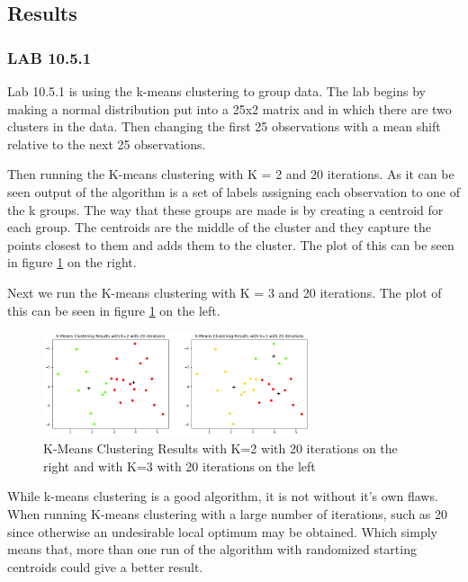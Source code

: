 \subsection{Results} %
\subsubsection*{LAB 10.5.1}
Lab 10.5.1 is using the k-means clustering to group data. The lab begins by making a normal distribution put into a 25x2 matrix and in which there are two clusters in the data. Then changing the first 25 observations with a mean shift relative to the next 25 observations.

Then running the K-means clustering with K = 2 and 20 iterations. As it can be seen output of the algorithm is a set of labels assigning each observation to one of the k groups. The way that these groups are made is by creating a centroid for each group. The centroids are the middle of the cluster and they capture the points closest to them and adds them to the cluster. The plot of this can be seen in figure \ref{fig:kmeansclusteringk2_20Iteration} on the right.

Next we run the K-means clustering with K = 3 and 20 iterations. The plot of this can be seen in figure \ref{fig:kmeansclusteringk2_20Iteration} on the left.

\begin{figure}[H]
	\centering
	\includegraphics[width=0.7\textwidth]{clusteringMethods/kmeansclustering/fig/k-mean.png}
	\caption{K-Means Clustering Results with K=2 with 20 iterations on the right and  with K=3 with 20 iterations on the left}
	\label{fig:kmeansclusteringk2_20Iteration}
\end{figure}

While k-means clustering is a good algorithm, it is not without it's own flaws. When running K-means clustering with a large number of iterations, such as 20 since otherwise an undesirable local optimum may be obtained. Which simply means that, more than one run of the algorithm with randomized starting centroids could give a better result.


